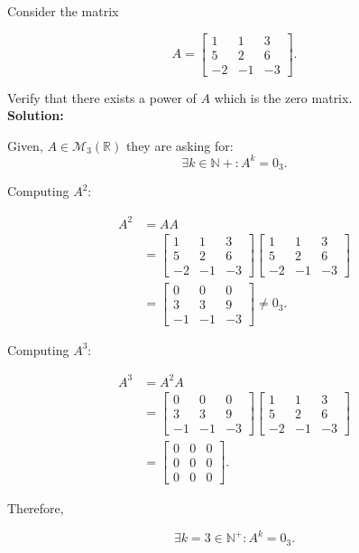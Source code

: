 \item Consider the matrix

$$
A = \begin{bmatrix}
    1 & 1 & 3 \\
    5 & 2 & 6 \\
    -2 & -1 & -3
\end{bmatrix}.
$$

Verify that there exists a power of $A$ which is the zero matrix.\\

\textbf{Solution:}

\begin{answer}
    Given, $A\in\mathcal{M}_3(\mathbb{R})$ they are asking for: 
    $$
        \exists k\in\mathbb{N+}:
        A^k=0_3.
    $$

    Computing $A^2$:

    $$
    \begin{aligned}
        A^2 &= AA \\[0.5em]
        &= \begin{bmatrix}
            1 & 1 & 3 \\
            5 & 2 & 6 \\
            -2 & -1 & -3
        \end{bmatrix}
        \begin{bmatrix}
            1 & 1 & 3 \\
            5 & 2 & 6 \\
            -2 & -1 & -3
        \end{bmatrix} \\[1em]
        &= \begin{bmatrix}
            0 & 0 & 0 \\
            3 & 3 & 9 \\
            -1 & -1 & -3
        \end{bmatrix}
        \neq 0_3.
    \end{aligned}
    $$

    Computing $A^3$:

    $$
    \begin{aligned}
        A^3 &= A^2A \\[0.5em]
        &= \begin{bmatrix}
            0 & 0 & 0 \\
            3 & 3 & 9 \\
            -1 & -1 & -3
        \end{bmatrix}
        \begin{bmatrix}
            1 & 1 & 3 \\
            5 & 2 & 6 \\
            -2 & -1 & -3
        \end{bmatrix} \\[1em]
        &= \boxed{\begin{bmatrix}
            0 & 0 & 0 \\
            0 & 0 & 0 \\
            0 & 0 & 0
        \end{bmatrix}}.
    \end{aligned}
    $$

    Therefore,

    $$
    \boxed{
        \exists k=3\in\mathbb{N}^+:
        A^k=0_3
    }.
    $$
\end{answer}
